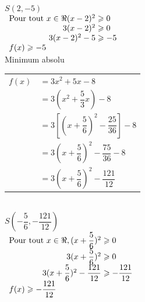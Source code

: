 \begin{enumerate}
$S(2,-5) $\\
 

$\begin{array}{r@{$\;$}l}
\text{Pour tout  } x \in \Re (x-2)^2 &   \geqslant 0 \\
                                        3 (x-2)^2 &   \geqslant 0 \\
                          3(x-2)^2 -5  &  \geqslant -5 \\     
 \multicolumn{2}{l}{ f(x) \geqslant -5 } \\                                              
\end{array}    $  \\ 

Minimum absolu \\

 {\renewcommand{\arraystretch }{2}
\begin{tabular}{l@{$\;$}l}
$f(x) $  & $= 3x^2 +5x -8$                                              \\
            & $= 3(x^2 +\dfrac{5}{3} x)  -8$                          \\
            & $= 3[(x +\dfrac{5}{6})^2  -\dfrac{25}{36} ] -8$  \\      
            & $= 3(x +\dfrac{5}{6})^2  -\dfrac{75}{36}  -8$    \\                  
            &$= 3(x +\dfrac{5}{6})^2  -\dfrac{121}{12}$         \\            
\end{tabular}\\

$S(-\dfrac{5}{6}, -\dfrac{121}{12}) $\\
 
$\begin{array}{r@{$\;$}l}
\text{Pour tout  } x \in \Re, (x+\dfrac{5}{6})^2 &   \geqslant 0 \\
                                        3 (x+\dfrac{5}{6})^2 &   \geqslant 0 \\
                          3(x+\dfrac{5}{6})^2 -\dfrac{121}{12}  &  \geqslant -\dfrac{121}{12}  \\     
 \multicolumn{2}{l}{ f(x) \geqslant -\dfrac{121}{12}  } \\                                              
\end{array}   $ \\

\renewcommand{\arraystretch }{1}}

\end{enumerate}


